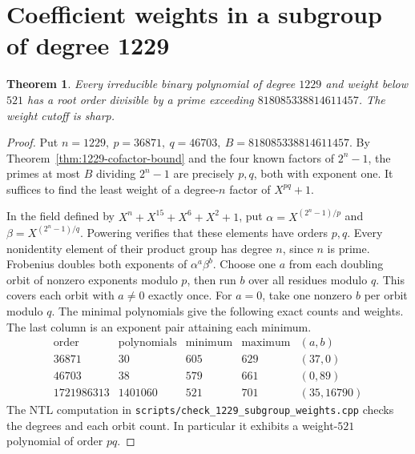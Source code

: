 \documentclass[11pt]{article}
\newtheorem{theorem}{Theorem}
\begin{document}
\section{Coefficient weights in a subgroup of degree 1229}
\begin{theorem}\label{thm:1229-subgroup-weight}
Every irreducible binary polynomial of degree \(1229\) and weight below
\(521\) has a root order divisible by a prime exceeding
\(818085338814611457\). The weight cutoff is sharp.
\end{theorem}
\begin{proof}
Put \(n=1229,\ p=36871,\ q=46703,\ B=818085338814611457\).
By Theorem~\ref{thm:1229-cofactor-bound} and the four known factors
of \(2^n-1\), the primes at most \(B\) dividing \(2^n-1\) are precisely
\(p,q\), both with exponent one. It suffices to find the least
weight of a degree-\(n\) factor of \(X^{pq}+1\).

In the field defined by \(X^n+X^{15}+X^6+X^2+1\), put
\(\alpha=X^{(2^n-1)/p}\) and \(\beta=X^{(2^n-1)/q}\).
Powering verifies that these elements have orders \(p,q\).
Every nonidentity element of their product group has degree \(n\),
since \(n\) is prime. Frobenius doubles both exponents of
\(\alpha^a\beta^b\). Choose one \(a\) from each doubling orbit
of nonzero exponents modulo \(p\), then run \(b\) over all residues
modulo \(q\). This covers each orbit with \(a\ne0\) exactly once.
For \(a=0\), take one nonzero \(b\) per orbit modulo \(q\).
The minimal polynomials give the following exact counts and weights.
The last column is an exponent pair attaining each minimum.
\[
\begin{array}{r|r|r|r|r}
\text{order}&\text{polynomials}&\text{minimum}&\text{maximum}&(a,b)\\\hline
36871&30&605&629&(37,0)\\
46703&38&579&661&(0,89)\\
1721986313&1401060&521&701&(35,16790)
\end{array}
\]
The NTL computation in \nolinkurl{scripts/check_1229_subgroup_weights.cpp}
checks the degrees and each orbit count. In particular it exhibits
a weight-\(521\) polynomial of order \(pq\).
\end{proof}
\end{document}
